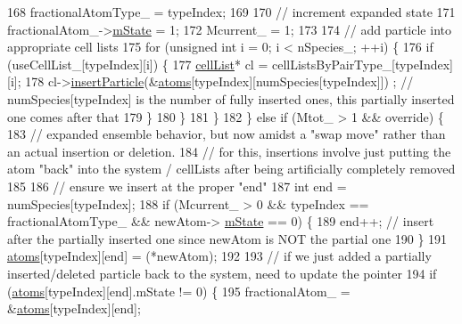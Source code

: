 \begin{DoxyCode}
168                     fractionalAtomType\_ = typeIndex;
169 
170                     \textcolor{comment}{// increment expanded state}
171                     fractionalAtom\_->\hyperlink{classatom_a3cb00c0c5b7533657e05af6ff4a42740}{mState} = 1;
172                     Mcurrent\_ = 1;
173 
174                     \textcolor{comment}{// add particle into appropriate cell lists}
175                     \textcolor{keywordflow}{for} (\textcolor{keywordtype}{unsigned} \textcolor{keywordtype}{int} i = 0; i < nSpecies\_; ++i) \{
176                         \textcolor{keywordflow}{if} (useCellList\_[typeIndex][i]) \{
177                             \hyperlink{classcell_list}{cellList}* cl = cellListsByPairType\_[typeIndex][i];
178                             cl->\hyperlink{classcell_list_a56c0012eed483e47248f9065bfc70fce}{insertParticle}(&\hyperlink{classsim_system_a90421b19082f7fb8fc23b7264b1161e4}{atoms}[typeIndex][numSpecies[typeIndex]])
      ; \textcolor{comment}{// numSpecies[typeIndex] is the number of fully inserted ones, this partially inserted one comes after
       that}
179                         \}
180                     \}
181                 \}
182             \} \textcolor{keywordflow}{else} \textcolor{keywordflow}{if} (Mtot\_ > 1 && \textcolor{keyword}{override}) \{
183                 \textcolor{comment}{// expanded ensemble behavior, but now amidst a "swap move" rather than an actual insertion
       or deletion.}
184                 \textcolor{comment}{// for this, insertions involve just putting the atom "back" into the system / cellLists
       after being artificially completely removed}
185 
186                 \textcolor{comment}{// ensure we insert at the proper "end"}
187                 \textcolor{keywordtype}{int} end = numSpecies[typeIndex];
188                 \textcolor{keywordflow}{if} (Mcurrent\_ > 0 && typeIndex == fractionalAtomType\_ && newAtom->
      \hyperlink{classatom_a3cb00c0c5b7533657e05af6ff4a42740}{mState} == 0) \{
189                     end++; \textcolor{comment}{// insert after the partially inserted one since newAtom is NOT the partial one}
190                 \}
191                 \hyperlink{classsim_system_a90421b19082f7fb8fc23b7264b1161e4}{atoms}[typeIndex][end] = (*newAtom);
192 
193                 \textcolor{comment}{// if we just added a partially inserted/deleted particle back to the system, need to
       update the pointer}
194                 \textcolor{keywordflow}{if} (\hyperlink{classsim_system_a90421b19082f7fb8fc23b7264b1161e4}{atoms}[typeIndex][end].mState != 0) \{
195                     fractionalAtom\_ = &\hyperlink{classsim_system_a90421b19082f7fb8fc23b7264b1161e4}{atoms}[typeIndex][end];

\end{DoxyCode}
